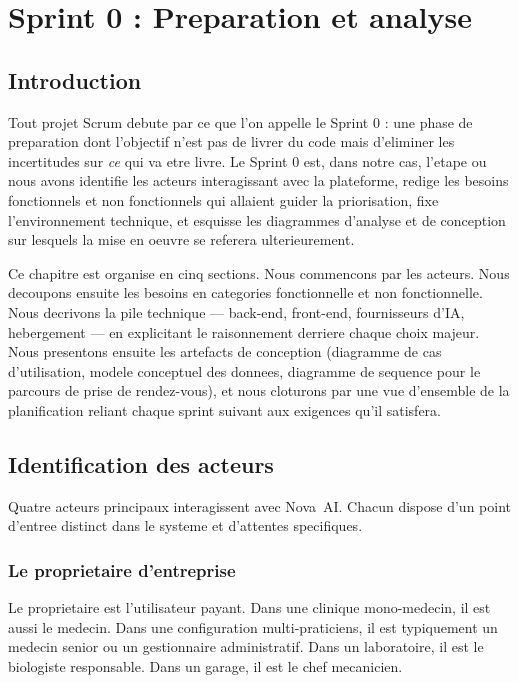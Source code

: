 \chapter{Sprint 0 : Preparation et analyse}

\section{Introduction}
Tout projet Scrum debute par ce que l'on appelle le Sprint 0 : une phase
de preparation dont l'objectif n'est pas de livrer du code mais d'eliminer
les incertitudes sur \emph{ce} qui va etre livre. Le Sprint 0 est, dans
notre cas, l'etape ou nous avons identifie les acteurs interagissant avec
la plateforme, redige les besoins fonctionnels et non fonctionnels qui
allaient guider la priorisation, fixe l'environnement technique, et
esquisse les diagrammes d'analyse et de conception sur lesquels la mise
en oeuvre se referera ulterieurement.

Ce chapitre est organise en cinq sections. Nous commencons par les acteurs.
Nous decoupons ensuite les besoins en categories fonctionnelle et non
fonctionnelle. Nous decrivons la pile technique --- back-end, front-end,
fournisseurs d'IA, hebergement --- en explicitant le raisonnement derriere
chaque choix majeur. Nous presentons ensuite les artefacts de conception
(diagramme de cas d'utilisation, modele conceptuel des donnees, diagramme
de sequence pour le parcours de prise de rendez-vous), et nous cloturons
par une vue d'ensemble de la planification reliant chaque sprint suivant
aux exigences qu'il satisfera.

\section{Identification des acteurs}
Quatre acteurs principaux interagissent avec Nova~AI. Chacun dispose d'un
point d'entree distinct dans le systeme et d'attentes specifiques.

\subsection{Le proprietaire d'entreprise}
Le proprietaire est l'utilisateur payant. Dans une clinique mono-medecin,
il est aussi le medecin. Dans une configuration multi-praticiens, il est
typiquement un medecin senior ou un gestionnaire administratif. Dans un
laboratoire, il est le biologiste responsable. Dans un garage, il est le
chef mecanicien.

